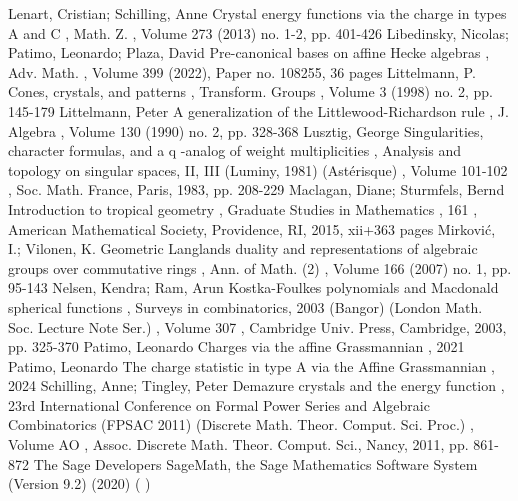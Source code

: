  Lenart, Cristian; Schilling, Anne Crystal energy functions via the charge in types A and C , Math. Z. , Volume 273 (2013) no. 1-2, pp. 401-426
 Libedinsky, Nicolas; Patimo, Leonardo; Plaza, David Pre-canonical bases on affine Hecke algebras , Adv. Math. , Volume 399 (2022), Paper no. 108255, 36 pages
 Littelmann, P. Cones, crystals, and patterns , Transform. Groups , Volume 3 (1998) no. 2, pp. 145-179
 Littelmann, Peter A generalization of the Littlewood-Richardson rule , J. Algebra , Volume 130 (1990) no. 2, pp. 328-368
 Lusztig, George Singularities, character formulas, and a q -analog of weight multiplicities , Analysis and topology on singular spaces, II, III (Luminy, 1981) (Astérisque) , Volume 101-102 , Soc. Math. France, Paris, 1983, pp. 208-229
 Maclagan, Diane; Sturmfels, Bernd Introduction to tropical geometry , Graduate Studies in Mathematics , 161 , American Mathematical Society, Providence, RI, 2015, xii+363 pages
 Mirković, I.; Vilonen, K. Geometric Langlands duality and representations of algebraic groups over commutative rings , Ann. of Math. (2) , Volume 166 (2007) no. 1, pp. 95-143
 Nelsen, Kendra; Ram, Arun Kostka-Foulkes polynomials and Macdonald spherical functions , Surveys in combinatorics, 2003 (Bangor) (London Math. Soc. Lecture Note Ser.) , Volume 307 , Cambridge Univ. Press, Cambridge, 2003, pp. 325-370
 Patimo, Leonardo Charges via the affine Grassmannian , 2021
 Patimo, Leonardo The charge statistic in type A via the Affine Grassmannian , 2024
 Schilling, Anne; Tingley, Peter Demazure crystals and the energy function , 23rd International Conference on Formal Power Series and Algebraic Combinatorics (FPSAC 2011) (Discrete Math. Theor. Comput. Sci. Proc.) , Volume AO , Assoc. Discrete Math. Theor. Comput. Sci., Nancy, 2011, pp. 861-872
 The Sage Developers SageMath, the Sage Mathematics Software System (Version 9.2) (2020) ( )
